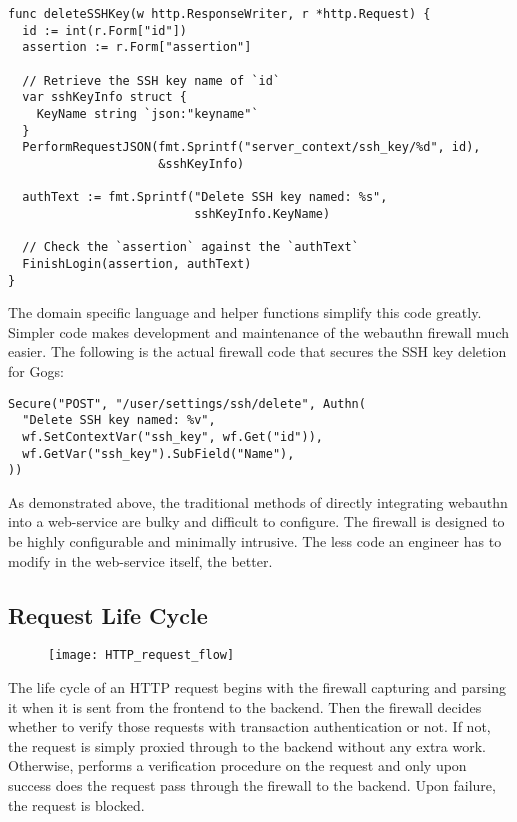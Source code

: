 \begin{lstlisting}
func deleteSSHKey(w http.ResponseWriter, r *http.Request) {
  id := int(r.Form["id"])
  assertion := r.Form["assertion"]

  // Retrieve the SSH key name of `id`
  var sshKeyInfo struct {
    KeyName string `json:"keyname"`
  }
  PerformRequestJSON(fmt.Sprintf("server_context/ssh_key/%d", id),
                     &sshKeyInfo)

  authText := fmt.Sprintf("Delete SSH key named: %s", 
                          sshKeyInfo.KeyName)

  // Check the `assertion` against the `authText`
  FinishLogin(assertion, authText)
}
\end{lstlisting}

The domain specific language and helper functions simplify this code greatly. Simpler code makes development and maintenance of the webauthn firewall much easier. The following is the actual firewall code that secures the SSH key deletion for Gogs:

\begin{minipage}{\linewidth}
\begin{lstlisting}
Secure("POST", "/user/settings/ssh/delete", Authn(
  "Delete SSH key named: %v",
  wf.SetContextVar("ssh_key", wf.Get("id")),
  wf.GetVar("ssh_key").SubField("Name"),
))
\end{lstlisting}
\end{minipage}

As demonstrated above, the traditional methods of directly integrating webauthn into a web-service are bulky and difficult to configure. The firewall is designed to be highly configurable and minimally intrusive. The less code an engineer has to modify in the web-service itself, the better.


\subsection{Request Life Cycle}

\begin{figure}[h]
  \centering
  \texttt{[image: HTTP\_request\_flow]}
\end{figure}

The life cycle of an HTTP request begins with the firewall capturing and parsing it when it is sent from the frontend to the backend. Then the firewall decides whether to verify those requests with transaction authentication or not. If not, the request is simply proxied through to the backend without any extra work. Otherwise, performs a verification procedure on the request and only upon success does the request pass through the firewall to the backend. Upon failure, the request is blocked.

